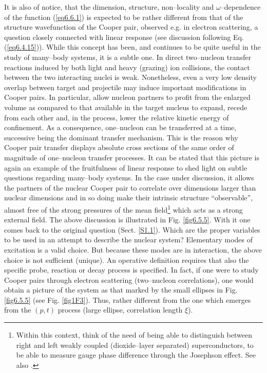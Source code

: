 It is also of notice, that the dimension, structure, non--locality and $\omega$--dependence of the function (\ref{eq6.6.1}) is expected to be rather different from that of the structure wavefunction of the Cooper pair, observed e.g. in electron scattering, a question closely connected with linear response (see discussion following Eq. (\ref{eq6.4.15})). While this concept has been, and continues to be quite useful in the study of many--body systems, it is a subtle one. In direct two--nucleon transfer reactions induced by both light and heavy (grazing) ion  collisions, the contact between the two interacting nuclei is weak. Nonetheless, even a very low density overlap between target and projectile may induce important modifications in Cooper pairs. In particular, allow nucleon partners to profit from the enlarged volume as compared to that available in the target nucleus to expand, recede from each other and, in the process, lower the relative kinetic energy of confinement. As a consequence, one--nucleon can be transferred at a time, successive being the dominant transfer mechanism. This is the reason why Cooper pair transfer displays absolute cross sections of the same order of magnitude of one--nucleon transfer processes. It can be stated that this picture is again an example of the fruitfulness of linear response to shed light on subtle questions regarding many--body systems. In the case under discussion, it allows the partners of the nuclear Cooper pair to correlate over dimensions larger than nuclear dimensions and in so doing make their intrinsic structure ``observable'', almost free of the strong pressures of the  mean field\footnote{Within this context, think of the need of being able to distinguish between   right and left weakly coupled (dioxide--layer separated) superconductors,  to be able to measure gauge phase difference through the Josephson effect. See also \cite{Magierski:17}.} which acts as a strong external field. The above discussion is illustrated in Fig. \ref{fig6.5.5}. With it one comes back to the original question (Sect. \ref{S1.1}). Which are the proper variables to be used in an attempt to describe the nuclear system? Elementary modes of excitation is a valid choice. But because these modes are in interaction, the above choice is not sufficient (unique). An operative definition requires that also the specific probe, reaction or decay process is specified. In fact, if one were to study Cooper pairs through electron scattering (two--nucleon correlations), one would obtain a picture of the system as that marked by the small ellipses in Fig. \ref{fig6.5.5} (see Fig. \ref{fig1F3}). Thus, rather different from the one  which emerges from the $(p,t)$ process (large ellipse, correlation length $\xi$).  
